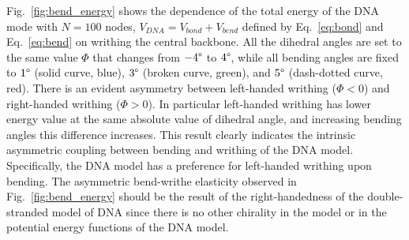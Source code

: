 \documentclass[a4paper,10pt]{article}
\begin{document}
Fig.~\ref{fig:bend_energy} shows the dependence of the total energy of the DNA mode with $N=100$ nodes, $V_{DNA}=V_{bond}+V_{bend}$ defined by Eq.~\ref{eq:bond} and Eq.~\ref{eq:bend} on writhing the central backbone.
All the dihedral angles are set to the same value $\Phi$ that changes from $-4\degree$ to $4\degree$, while all bending angles are fixed to $1\degree$ (solid curve, blue), $3\degree$ (broken curve, green), and $5\degree$ (dash-dotted curve, red).
There is an evident asymmetry between left-handed writhing ($\Phi<0$) and right-handed writhing ($\Phi>0$).
In particular left-handed writhing has lower energy value at the same absolute value of dihedral angle, and increasing bending angles this difference increases.
This result clearly indicates the intrinsic asymmetric coupling between bending and writhing of the DNA model.
Specifically, the DNA model has a preference for left-handed writhing upon bending.
The asymmetric bend-writhe elasticity observed in Fig.~\ref{fig:bend_energy} should be the result of the right-handedness of the double-stranded model of DNA since there is no other chirality in the model or in the potential energy functions of the DNA model.
\end{document}
